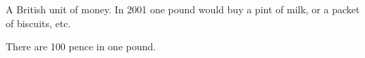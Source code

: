 A British unit of money. In 2001 one pound would buy a pint of milk,
or a packet of biscuits, etc. 
\par
There are 100 pence in one pound.